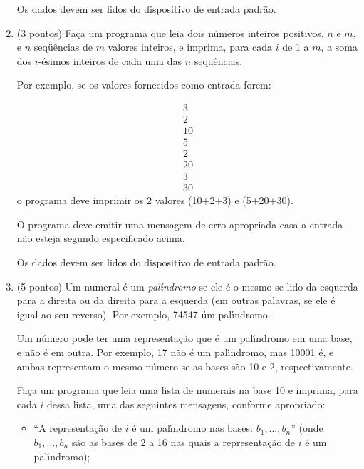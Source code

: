 \documentclass{article}
\begin{document}
\begin{enumerate}
Os dados devem ser lidos do dispositivo de entrada padr\~ao.

\item (3 pontos) Fa\c{c}a um programa que leia dois n\'umeros inteiros positivos, 
$n$ e $m$, e $n$ seq\"u\^encias de $m$ valores inteiros, e imprima,
para cada $i$ de 1 a $m$, a soma dos $i$-\'esimos inteiros de cada uma
das $n$ sequ\^encias.

Por exemplo, se os valores fornecidos como entrada forem:
  
  \[ \begin{array}{l}
        3    \\
        2    \\
        10   \\
        5    \\
        2    \\
        20   \\
        3    \\
        30   
      \end{array} \]
o programa deve imprimir os 2 valores (10+2+3) e (5+20+30).

O programa deve emitir uma mensagem de erro apropriada casa a entrada
n\~ao esteja segundo especificado acima.

Os dados devem ser lidos do dispositivo de entrada padr\~ao.

\item (5 pontos) Um numeral \'e um {\em pal\'{\i}ndromo\/} se ele \'e  
o mesmo se lido da esquerda para a direita ou da direita para a
esquerda (em outras palavras, se ele \'e igual ao seu reverso). Por
exemplo, 74547 \' um pal\'{\i}ndromo.

Um n\'umero pode ter uma representa\c{c}\~ao que \'e um
pal\'{\i}ndromo em uma base, e n\~ao \'e em outra. Por exemplo, 17
n\~ao \'e um pal\'{\i}ndromo, mas 10001 \'e, e ambas representam o
mesmo n\'umero se as bases s\~ao 10 e 2, respectivamente.

Fa\c{c}a um programa que leia uma lista de numerais na base 10 e
imprima, para cada $i$ dessa lista, uma das seguintes mensagens,
conforme apropriado:

  \begin{itemize}
 
     \item ``A representa\c{c}\~ao de $i$ \'e um pal\'{\i}ndromo nas
     bases: $b_1, \ldots, b_n$'' (onde $b_1, \ldots, b_n$ s\~ao as
     bases de 2 a 16 nas quais a representa\c{c}\~ao de $i$ \'e um
     pal\'{\i}ndromo);


\end{itemize}
\end{enumerate}
\end{document}
